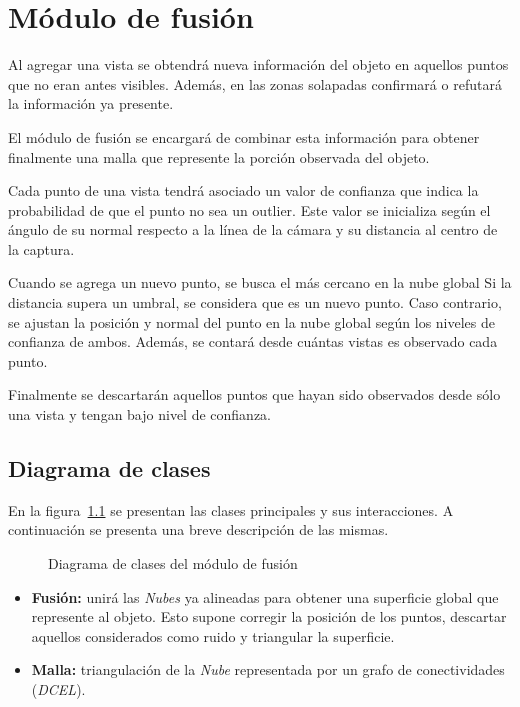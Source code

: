\chapter{Módulo de fusión}
	Al agregar una vista se obtendrá nueva información del objeto en aquellos
	puntos que no eran antes visibles.
	Además, en las zonas solapadas confirmará o refutará la información ya presente.

	El módulo de fusión se encargará de combinar esta información para obtener
	finalmente una malla que represente la porción observada del objeto.

	Cada punto de una vista tendrá asociado un valor de confianza que indica la
	probabilidad de que el punto no sea un outlier.
	Este valor se inicializa según el ángulo de su normal respecto a la línea
	de la cámara y su distancia al centro de la captura.

	Cuando se agrega un nuevo punto, se busca el más cercano en la nube global
	Si la distancia supera un umbral, se considera que es un nuevo punto. Caso
	contrario, se ajustan la posición y normal del punto en la nube global
	según los niveles de confianza de ambos.  Además, se contará desde cuántas
	vistas es observado cada punto.


	Finalmente se descartarán aquellos puntos que hayan sido observados desde sólo una vista y tengan bajo nivel de confianza.

	\section{Diagrama de clases}
		En la figura~\ref{fig:fusion_class} se presentan las clases principales y sus interacciones.
		A continuación se presenta una breve descripción de las mismas.
		\begin{figure}
			\caption{\label{fig:fusion_class}Diagrama de clases del módulo de fusión}
		\end{figure}

		\begin{itemize}
			\item {\bfseries Fusión:} unirá las \emph{Nubes} ya alineadas para
				obtener una superficie global que represente al objeto.
				Esto supone corregir la posición de los puntos, descartar
				aquellos considerados como ruido y triangular la superficie.
			\item {\bfseries Malla:} triangulación de la \emph{Nube} representada por un grafo de conectividades (\emph{DCEL}).
		\end{itemize}


